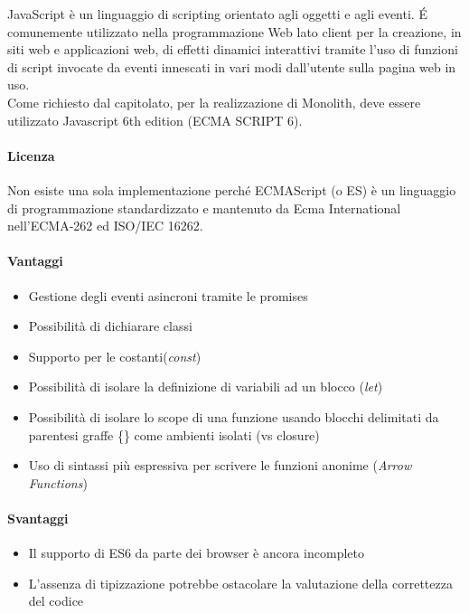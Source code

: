 JavaScript è un linguaggio di scripting orientato agli oggetti e agli
eventi. \'E comunemente utilizzato nella programmazione Web lato
client per la creazione, in siti web e applicazioni web, di effetti
dinamici interattivi tramite l'uso di funzioni di script invocate da
eventi innescati in vari modi dall'utente sulla pagina web in
uso. \\ Come richiesto dal capitolato, per la realizzazione di
Monolith, deve essere utilizzato Javascript 6th edition (ECMA SCRIPT
6). \\ 

\paragraph{Licenza}  
Non esiste una sola implementazione perché ECMAScript (o ES) è un
linguaggio di programmazione standardizzato e mantenuto da Ecma
International nell'ECMA-262 ed ISO/IEC 16262. \\


\paragraph{Vantaggi}
\begin{itemize}
	\item Gestione degli eventi asincroni tramite le promises
	\item Possibilità di dichiarare classi
	\item Supporto per le costanti(\emph{const})
	\item Possibilità di isolare la definizione di variabili ad un blocco (\emph{let})
	\item Possibilità di isolare lo scope di una funzione usando
     blocchi delimitati da parentesi graffe \{\} come ambienti isolati (vs closure)
	\item Uso di sintassi più espressiva per scrivere le funzioni anonime (\emph{Arrow Functions})
	
\end{itemize}

\paragraph{Svantaggi} 
\begin{itemize}
	\item Il supporto di ES6 da parte dei browser è ancora incompleto
	\item L’assenza di tipizzazione potrebbe ostacolare la valutazione della correttezza del codice
\end{itemize}

